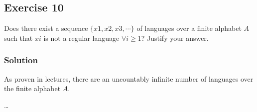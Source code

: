 \documentclass[12pt]{article}
\begin{document}
\subsection*{Exercise 10}

Does there exist a sequence $\{ x1, x2, x3, \cdots \}$ of languages over a finite alphabet $A$ such that $xi$ is not a regular language $\forall i \geq 1$?
Justify your answer.

\subsubsection*{Solution}

As proven in lectures, there are an uncountably infinite number of languages over the finite alphabet $A$.

\ldots
\end{document}
